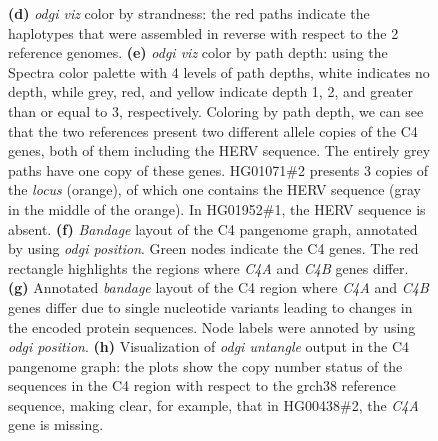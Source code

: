 \begin{figure}[!htb]
{        \textbf{(d)} \textit{odgi viz} color by strandness: the red paths indicate the haplotypes that were assembled in reverse with respect to the 2 reference genomes.
        \textbf{(e)} \textit{odgi viz} color by path depth: using the Spectra color palette with 4 levels of path depths, white indicates no depth, while grey, red, and yellow indicate depth 1, 2, and greater than or equal to 3, respectively.
        Coloring by path depth, we can see that the two references present two different allele copies of the C4 genes, both of them including the HERV sequence.
        The entirely grey paths have one copy of these genes.
        HG01071\#2 presents 3 copies of the \textit{locus} (orange), of which one contains the HERV sequence (gray in the middle of the orange).
        In HG01952\#1, the HERV sequence is absent.
        \textbf{(f)} \textit{Bandage} layout of the C4 pangenome graph, annotated by using \textit{odgi position}. Green nodes indicate the C4 genes. The red rectangle highlights the regions where \textit{C4A} and \textit{C4B} genes differ.
        \textbf{(g)} Annotated \textit{bandage} layout of the C4 region where \textit{C4A} and \textit{C4B} genes differ due to single nucleotide variants leading to changes in the encoded protein sequences. Node labels were annoted by using \textit{odgi position}.
        \textbf{(h)} Visualization of \textit{odgi untangle} output in the C4 pangenome graph: the plots show the copy number status of the sequences in the C4 region with respect to the grch38 reference sequence, making clear, for example, that in HG00438\#2, the \textit{C4A} gene is missing. \vspace{-1em}
    }
    \label{fig:odgi_viz}
\end{figure}


